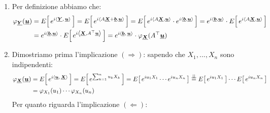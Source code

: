 \begin{teorema}
\begin{dimostrazione}
\begin{enumerate}
            Osserviamo anzitutto che, per ogni $k\in\{1,\dots,n\},\quad  
\frac{\partial}{\partial u_k} e^{i \langle \ve{u}, \ve{X}\rangle}
= i X_k\, e^{i \langle \ve{u}, \ve{X}\rangle}$. Iterando questa identità, per una qualunque $m$-upla di indici
$k_1,\dots,k_m$, otteniamo
\[
\frac{\partial^m}{\partial u_{k_1}\cdots \partial u_{k_m}}
e^{i \langle \ve{u}, \ve{X}\rangle}
= i^m \, X_{k_1}\cdots X_{k_m}\,
e^{i \langle \ve{u}, \ve{X}\rangle}
\]
Siccome possiamo integrare, e scambiare il segno di integrale e derivata (non dimostrato), otteniamo che:
\begin{align*}
    & \int_{\mathbb{R}^n}\frac{\partial^m}{\partial u_{k_1}\cdots \partial u_{k_m}}
    e^{i \langle \ve{u}, \ve{X}\rangle}
    = \int_{\mathbb{R}^n}i^m \, X_{k_1}\cdots X_{k_m}\,
    e^{i \langle \ve{u}, \ve{X}\rangle}    \\
    \Rightarrow \quad  &\frac{\partial^m}{\partial u_{k_1}\cdots \partial u_{k_m}} \varphi_{\ve{X}} (\ve{u}) = i^m\cdot \E{X_{k_1}\cdots X_{k_m}\,
    e^{i \langle \ve{u}, \ve{X}\rangle}}
\end{align*}
            \item Per definizione abbiamo che:
            \begin{align*}
                \varphi_{\underline{{\boldsymbol{Y}}}} (\underline{{\boldsymbol{u}}}) & = E\!\left[\,e^{i\left\langle \underline{{\boldsymbol{Y}}},\, \underline{{\boldsymbol{u}}} \right\rangle}\,\right] = E\!\left[\,e^{i \left\langle A\underline{{\boldsymbol{X}}} + \underline{{\boldsymbol{b}}}, \underline{{\boldsymbol{u}}}\right\rangle}\,\right] = E\!\left[\,e^{i \left\langle A\underline{{\boldsymbol{X}}}, \underline{{\boldsymbol{u}}}\right\rangle} \cdot e^{i \left\langle\underline{{\boldsymbol{b}}}, \underline{{\boldsymbol{u}}}\right\rangle}\,\right] = e^{i \left\langle\underline{{\boldsymbol{b}}}, \underline{{\boldsymbol{u}}}\right\rangle}\cdot E\!\left[\,e^{i \left\langle A\underline{{\boldsymbol{X}}}, \underline{{\boldsymbol{u}}}\right\rangle}\,\right] \\
                & =  e^{i \left\langle\underline{{\boldsymbol{b}}}, \underline{{\boldsymbol{u}}}\right\rangle}\cdot E\!\left[\,e^{i \left\langle \underline{{\boldsymbol{X}}}, A^\top\underline{{\boldsymbol{u}}}\right\rangle}\,\right] = e^{i\left\langle \underline{{\boldsymbol{b}}},\, \underline{{\boldsymbol{u}}} \right\rangle}\cdot \varphi_{\underline{{\boldsymbol{X}}}}(A^\top \underline{{\boldsymbol{u}}})
            \end{align*}
            \item Dimostriamo prima l'implicazione $(\Rightarrow)$: sapendo che $X_1,..., X_n$ sono indipendenti:
            \begin{align*}
                \varphi_{\ve{X}} (\ve{u}) & = \E{e^{i\scalar{u}{X}}} = \E{e^{\sum_{k=1}^n u_kX_k}} = \E{e^{iu_1 X_1}\cdots e^{iu_n X_n}} \overset{\ind}{=} \E{e^{iu_1 X_1}}\cdots \E{e^{iu_n X_n}} \\
                & = \varphi_{X_1}(u_1)\cdots \varphi_{X_n}(u_n)
            \end{align*}
            Per quanto riguarda l'implicazione $(\Leftarrow)$:
            \begin{align*}

\end{align*}
\end{enumerate}
\end{dimostrazione}
\end{teorema}
